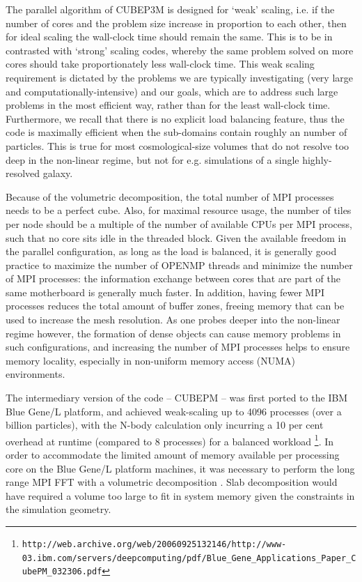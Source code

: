 The parallel algorithm of {\small CUBEP3M} is designed for `weak' 
scaling, i.e. if the number of cores and the problem size 
increase in proportion to each other, then for ideal scaling the 
wall-clock time should remain the same. This is to be in contrasted with `strong' 
scaling codes, whereby the same problem solved on more cores should take 
proportionately less wall-clock time. This weak scaling requirement 
is dictated by the problems we are typically investigating (very 
large and computationally-intensive) and our goals, which are to 
address such large problems in the most efficient way, rather than 
for the least wall-clock time. Furthermore, we recall that there is no explicit 
load balancing feature, thus the code is maximally efficient when the sub-domains
contain roughly an  number of particles. This is true for most
cosmological-size volumes that do not resolve too deep in the non-linear regime, 
but not for e.g. simulations of a single highly-resolved galaxy. 

Because of the volumetric decomposition, the total number of {\small MPI} processes needs
to be a perfect cube. Also, for maximal resource usage, the number of tiles per node 
should be a multiple of the number of available {\small CPU}s per {\small MPI} process,
such that no core sits idle in the threaded block.
Given the available freedom in the parallel configuration, as long as the load is balanced, it is generally good practice to maximize the number of {\small OPENMP} threads and minimize the number of {\small MPI} processes:
the information exchange between cores that are part of the same motherboard is generally much faster.
In addition, having fewer {\small MPI} processes reduces the total amount of buffer zones, 
freeing memory that can be used to increase the mesh resolution. 
As one probes deeper into the non-linear regime however, 
the formation of dense objects can cause memory problems in such configurations, and increasing 
the number of {\small MPI} processes helps to ensure memory locality,
especially in non-uniform memory access (NUMA) environments.




 The intermediary version of the code -- {\small CUBEPM} --
was first  ported to the IBM Blue Gene/L platform, and achieved 
weak-scaling up to 4096 processes (over a billion particles), with the N-body calculation only incurring a 10 per cent overhead 
at runtime (compared to 8 processes) for a balanced workload \footnote{\tt http://web.archive.org/web/20060925132146/http://www-03.ibm.com/servers/deepcomputing/pdf/Blue\_Gene\_Applications\_Paper\_CubePM\_032306.pdf}.  In order to 
accommodate the limited amount of memory available per processing core on the 
Blue Gene/L platform machines, it was necessary to perform the long range {\small MPI FFT}
with a volumetric decomposition \citep{3DFFT}.
Slab decomposition would have required a volume too large to fit in system 
memory given the constraints in the simulation geometry. 

